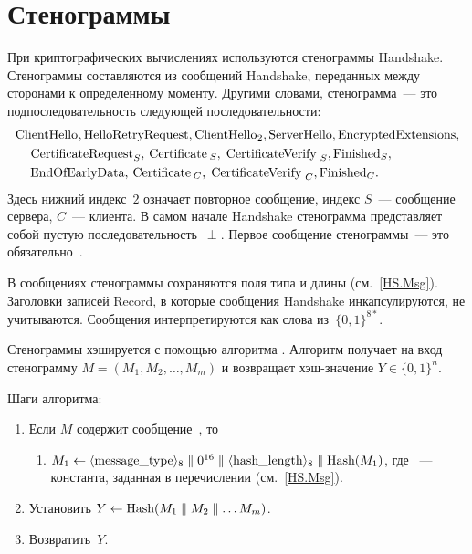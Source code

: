 \section{Стенограммы}\label{CRYPTO.Transcr} 

При криптографических вычислениях используются стенограммы Handshake.
Стенограммы составляются из сообщений Handshake, переданных между сторонами к 
определенному моменту. 
%
Другими словами, стенограмма~--- это подпоследовательность следующей 
последовательности:
\begin{align*}
&\code{ClientHello}, \code{HelloRetryRequest}, \code{ClientHello}_2, 
\code{ServerHello},\code{EncryptedExtensions},\\ 
%
&\hspace{12pt}\code{CertificateRequest}_S, \code{Certificate}_S, 
\code{CertificateVerify}_S, \code{Finished}_S,\\
%
&\hspace{12pt}\code{EndOfEarlyData}, \code{Certificate}_C, 
\code{CertificateVerify}_C, \code{Finished}_C.
\end{align*}
Здесь нижний индекс~$2$ означает повторное сообщение, 
индекс $S$~--- сообщение сервера, $C$~--- клиента.
%
В самом начале Handshake стенограмма представляет собой пустую 
последовательность~$\perp$. Первое сообщение стенограммы~--- это 
обязательно~.

В сообщениях стенограммы сохраняются поля типа и длины (см.~\ref{HS.Msg}). 
Заголовки записей Record, в которые сообщения Handshake инкапсулируются, не 
учитываются. Сообщения интерпретируются как слова из~$\{0,1\}^{8*}$. 

Стенограммы хэшируется с помощью алгоритма . 
Алгоритм получает на вход стенограмму $M=(M_1,M_2,\ldots,M_m)$
и возвращает хэш-значение $Y\in\{0,1\}^n$.

Шаги алгоритма:
\begin{enumerate}
\item
Если $M$ содержит сообщение~, то 
\begin{enumerate}
\item
$M_1\gets\itob{\code{message_type}}_8\parallel 0^{16}\parallel
\itob{\code{hash_length}}_8\parallel\code{Hash}(M_1)$,
где ~--- константа, заданная в перечислении
 (см.~\ref{HS.Msg}).
\end{enumerate}
\item
Установить $Y\gets\code{Hash}(M_1\parallel M_2\parallel\ldots M_m)$.
\item
Возвратить~$Y$.
\end{enumerate}

